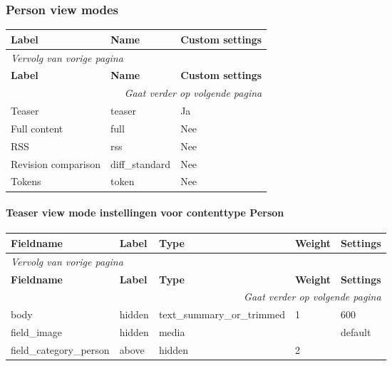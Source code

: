 \subsubsection{Person view modes}
  \begin{longtable}{| p{5.00cm}|p{5.00cm}|p{5.00cm}|}
  \hline
  \rowcolor{tableheader}
  \textbf{Label} & \textbf{Name} & \textbf{Custom settings}  \tabularnewline
  \hline
\endfirsthead
\multicolumn{3}{l}{\textit{Vervolg van vorige pagina}} \\
\hline
\rowcolor{tableheader}
  \textbf{Label} & \textbf{Name} & \textbf{Custom settings}  \tabularnewline
  \hline
\hline
\endhead
\multicolumn{3}{r}{\textit{Gaat verder op volgende pagina}} \\
\endfoot
\hline
\endlastfoot
  Teaser & teaser & Ja  \tabularnewline
  \hline
  Full content & full & Nee  \tabularnewline
  \hline
  RSS & rss & Nee  \tabularnewline
  \hline
  Revision comparison & diff\_standard & Nee  \tabularnewline
  \hline
  Tokens & token & Nee  \tabularnewline
  \hline
  \end{longtable}

\paragraph{Teaser view mode instellingen voor contenttype Person }

  \begin{longtable}{| p{3.00cm}|p{3.00cm}|p{3.00cm}|p{3.00cm}|p{3.00cm}|}
  \hline
  \rowcolor{tableheader}
  \textbf{Fieldname} & \textbf{Label} & \textbf{Type} & \textbf{Weight} & \textbf{Settings}  \tabularnewline
  \hline
\endfirsthead
\multicolumn{5}{l}{\textit{Vervolg van vorige pagina}} \\
\hline
\rowcolor{tableheader}
  \textbf{Fieldname} & \textbf{Label} & \textbf{Type} & \textbf{Weight} & \textbf{Settings}  \tabularnewline
  \hline
\hline
\endhead
\multicolumn{5}{r}{\textit{Gaat verder op volgende pagina}} \\
\endfoot
\hline
\endlastfoot
  body & hidden & text\_summary\_or\_trimmed & 1 & 600  \tabularnewline
  \hline
  field\_image & hidden & media &   & default  \tabularnewline
  \hline
  field\_category\_person & above & hidden & 2 &    \tabularnewline
  \hline
  \end{longtable}

